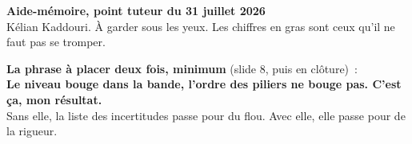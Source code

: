 \documentclass[10pt,a4paper]{article}
\begin{document}
{\color{navy}\Large\bfseries Aide-mémoire, point tuteur du 31 juillet 2026}\\[2pt]
{\footnotesize Kélian Kaddouri. À garder sous les yeux. Les chiffres en gras sont ceux qu'il ne faut pas se tromper.}

\vspace{4pt}
\begin{reflexe}
\textbf{La phrase à placer deux fois, minimum} (slide 8, puis en clôture)~:\\
\textbf{\og Le niveau bouge dans la bande, l'ordre des piliers ne bouge pas. C'est ça, mon résultat.\fg{}}\\[3pt]
{\footnotesize Sans elle, la liste des incertitudes passe pour du flou. Avec elle, elle passe pour de la rigueur.}
\end{reflexe}
\end{document}
